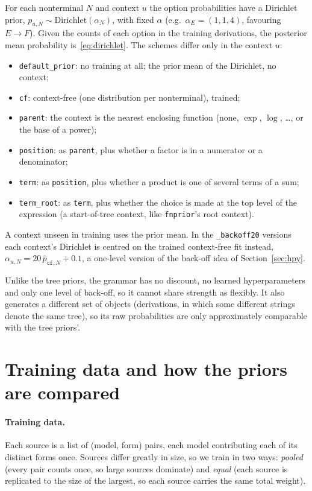 \documentclass[11pt]{article}
\begin{document}
For each nonterminal $N$ and context $u$ the option probabilities have a Dirichlet prior,
$p_{u,N} \sim \mathrm{Dirichlet}(\alpha_N)$, with fixed $\alpha$ (e.g.\ $\alpha_E = (1,1,4)$, favouring
$E \to F$). Given the counts of each option in the training derivations, the posterior mean probability
is~\eqref{eq:dirichlet}. The schemes differ only in the context $u$:
\begin{itemize}
  \item \texttt{default\_prior}: no training at all; the prior mean of the Dirichlet, no context;
  \item \texttt{cf}: context-free (one distribution per nonterminal), trained;
  \item \texttt{parent}: the context is the nearest enclosing function (none, $\exp$, $\log$, \dots, or
  the base of a power);
  \item \texttt{position}: as \texttt{parent}, plus whether a factor is in a numerator or a denominator;
  \item \texttt{term}: as \texttt{position}, plus whether a product is one of several terms of a sum;
  \item \texttt{term\_root}: as \texttt{term}, plus whether the choice is made at the top level of the
  expression (a start-of-tree context, like \texttt{fnprior}'s root context).
\end{itemize}
A context unseen in training uses the prior mean. In the \texttt{\_backoff20} versions each context's
Dirichlet is centred on the trained context-free fit instead,
$\alpha_{u,N} = 20\, \hat p_{\texttt{cf},N} + 0.1$, a one-level version of the back-off idea of
Section~\ref{sec:hpy}.

Unlike the tree priors, the grammar has no discount, no learned hyperparameters and only one level of
back-off, so it cannot share strength as flexibly. It also generates a different set of objects
(derivations, in which some different strings denote the same tree), so its raw probabilities are only
approximately comparable with the tree priors'.

\section{Training data and how the priors are compared}\label{sec:evaluation}

\paragraph{Training data.} Each source is a list of (model, form) pairs, each model contributing each
of its distinct forms once. Sources differ greatly in size, so we train in two ways: \emph{pooled}
(every pair counts once, so large sources dominate) and \emph{equal} (each source is replicated to the
size of the largest, so each source carries the same total weight).
\end{document}
